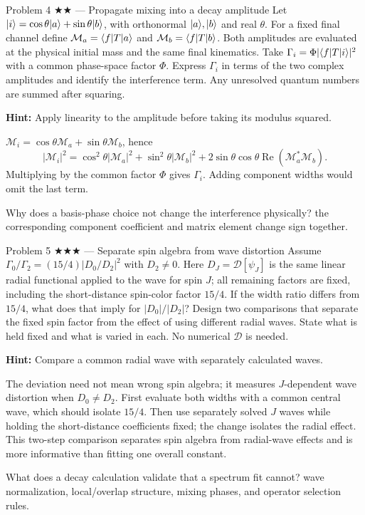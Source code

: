 \documentclass[11pt]{article}
\begin{document}
\begin{problem}{Problem 4 ★★ — Propagate mixing into a decay amplitude}
Let $\lvert i\rangle=\cos\theta\lvert a\rangle+\sin\theta\lvert b\rangle$, with orthonormal
$\lvert a\rangle,\lvert b\rangle$ and real $\theta$. For a fixed final channel define
$\mathcal M_a=\langle f\rvert T\lvert a\rangle$ and $\mathcal M_b=\langle f\rvert T\lvert b\rangle$.
Both amplitudes are evaluated at the physical initial mass and the same
final kinematics. Take $\Gamma_i=\Phi|\langle f\rvert T\lvert i\rangle|^2$ with a common
phase-space factor $\Phi$.
Express $\Gamma_i$ in terms of the two complex amplitudes and identify the
interference term. Any unresolved quantum numbers are summed after squaring.

\textbf{Hint:} Apply linearity to the amplitude before taking its modulus squared.
\end{problem}
\begin{solution}
$\mathcal M_i=\cos\theta\mathcal M_a+\sin\theta\mathcal M_b$, hence
\[
|\mathcal M_i|^2=\cos^2\theta|\mathcal M_a|^2+
\sin^2\theta|\mathcal M_b|^2+2\sin\theta\cos\theta
\operatorname{Re}(\mathcal M_a^*\mathcal M_b).
\]
Multiplying by the common factor $\Phi$ gives $\Gamma_i$.
Adding component widths would omit the last term.
\end{solution}
\begin{quiz}
Why does a basis-phase choice not change the interference physically? \answer
the corresponding component coefficient and matrix element change sign
together.
\end{quiz}

\begin{problem}{Problem 5 ★★★ — Separate spin algebra from wave distortion}
Assume $\Gamma_0/\Gamma_2=(15/4)|D_0/D_2|^2$ with $D_2\ne0$.
Here $D_J=\mathcal D[\psi_J]$ is the same linear radial functional applied
to the wave for spin $J$; all remaining factors are fixed, including the
short-distance spin-color factor $15/4$.
If the width ratio differs from $15/4$, what does that imply for
$|D_0|/|D_2|$? Design two comparisons that separate the fixed spin factor
from the effect of using different radial waves. State what is held fixed
and what is varied in each. No numerical $\mathcal D$ is needed.

\textbf{Hint:} Compare a common radial wave with separately calculated waves.
\end{problem}
\begin{solution}
The deviation need not mean wrong spin algebra; it measures $J$-dependent wave
distortion when $D_0\ne D_2$. First evaluate both widths with a common central
wave, which should isolate $15/4$. Then use separately solved $J$ waves while
holding the short-distance coefficients fixed; the change isolates the radial
effect. This two-step comparison separates spin algebra from radial-wave effects
and is more informative than fitting one overall constant.
\end{solution}
\begin{quiz}
What does a decay calculation validate that a spectrum fit cannot? \answer wave
normalization, local/overlap structure, mixing phases, and operator selection
rules.
\end{quiz}
\end{document}
